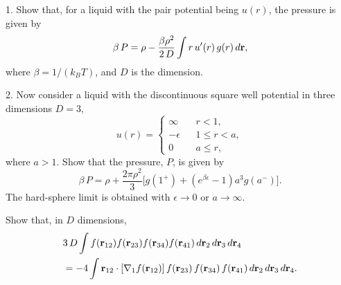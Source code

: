 \documentclass[12pt]{book}
\begin{document}

1. Show that, for a liquid with the pair potential being $u(r)$,
the pressure is given by
\begin{equation}
  \beta \, P = \rho - \frac{\beta \rho^2} {2\, D} \int r \, u'(r) \, g(r) \, d\boldsymbol{\mathbf{r}},
\end{equation}
where $\beta = 1/(k_BT)$, and $D$ is the dimension.

2. Now consider a liquid with the discontinuous square well potential
in three dimensions $D = 3$,
\begin{equation}
  u(r) =
  \begin{cases}
    \infty      \quad   & r < 1,          \\
    -\epsilon           & 1 \le r < a,    \\
    0                   & a \le r,
  \end{cases}
\end{equation}
where $a > 1$.
%
Show that the pressure, $P$, is given by
\begin{equation}
  \beta \, P = \rho
            + \frac{2 \pi \rho^2}{3}
              \big[g(1^+)
              + (e^{\beta \epsilon} - 1) a^3 g(a^-)\big].
\end{equation}
%
The hard-sphere limit is obtained with $\epsilon \rightarrow 0$
or $a \rightarrow \infty$.




Show that, in $D$ dimensions,
\begin{align*}
  &
  3 \, D
  \int
  f(\boldsymbol{\mathbf{r}}_{12}) f(\boldsymbol{\mathbf{r}}_{23}) f(\boldsymbol{\mathbf{r}}_{34}) f(\boldsymbol{\mathbf{r}}_{41})
  \, d\boldsymbol{\mathbf{r}}_2 \, d\boldsymbol{\mathbf{r}}_3 \, d\boldsymbol{\mathbf{r}}_4 \\
  &=
  -4 \int
  \boldsymbol{\mathbf{r}}_{12} \cdot [\nabla_1 f(\boldsymbol{\mathbf{r}}_{12})]
  \, f(\boldsymbol{\mathbf{r}}_{23}) \, f(\boldsymbol{\mathbf{r}}_{34}) \, f(\boldsymbol{\mathbf{r}}_{41})
  \, d\boldsymbol{\mathbf{r}}_2 \, d\boldsymbol{\mathbf{r}}_3 \, d\boldsymbol{\mathbf{r}}_4.
\end{align*}





\end{document}
